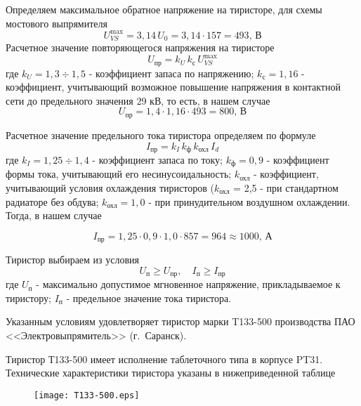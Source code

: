 Определяем максимальное обратное напряжение на тиристоре, для схемы мостового выпрямителя
\begin{equation*}
 U_{VS}^{\max} = 3,14 \, U_0 = 3,14 \cdot 157 = 493, \, \text{В}
\end{equation*}
Расчетное значение повторяющегося напряжения на тиристоре
\begin{equation*}
 U_{\text{пр}} = k_{U} \, k_{\text{с}} \, U_{VS}^{\max} 
\end{equation*}
где $k_{U} = 1,3 \div 1,5$ - коэффициент запаса по напряжению; $k_{\text{с}} = 1,16$ - коэффициент, учитывающий возможное повышение напряжения в контактной сети до предельного значения 29 кВ, то есть, в нашем случае
\begin{equation*}
 U_{\text{пр}} = 1,4 \cdot 1,16 \cdot 493 = 800, \, \text{В} 
\end{equation*}

Расчетное значение предельного тока тиристора определяем по формуле
\begin{equation*}
 I_{\text{пр}} = k_I \, k_{\text{ф}} \, k_{\text{охл}} \, I_d
\end{equation*}
где $k_I = 1,25 \div 1,4$ - коэффициент запаса по току; $k_{\text{ф}} = 0,9$ - коэффициент формы тока, учитывающий его несинусоидальность; $k_{\text{охл}}$ - коэффициент, учитывающий условия охлаждения тиристоров ($k_{\text{охл}}$ = 2,5 - при стандартном радиаторе без обдува; $k_{\text{охл}} = 1,0$ - при принудительном воздушном охлаждении. Тогда, в нашем случае

\begin{equation*}
 I_{\text{пр}} = 1,25 \cdot 0,9 \cdot 1,0 \cdot 857 = 964 \approx 1000, \, \text{А}
\end{equation*}

Тиристор выбираем из условия 
\begin{equation*}
 U_{\text{п}} \ge U_{\text{пр}}, \quad I_{\text{п}} \ge I_{\text{пр}}
\end{equation*}
где $U_{\text{п}}$ - максимально допустимое мгновенное напряжение, прикладываемое к тиристору; $I_{\text{п}}$ - предельное значение тока тиристора.

Указанным условиям удовлетворяет тиристор  марки T133-500 производства ПАО <<Электровыпрямитель>> (г.~Саранск).

Тиристор Т133-500 имеет исполнение таблеточного типа в корпусе PT31. Технические характеристики тиристора указаны в нижеприведенной таблице

\begin{figure}[H]
    \centering        
    \texttt{[image: T133-500.eps]}    
    \label{fig:T133-500}
\end{figure}

